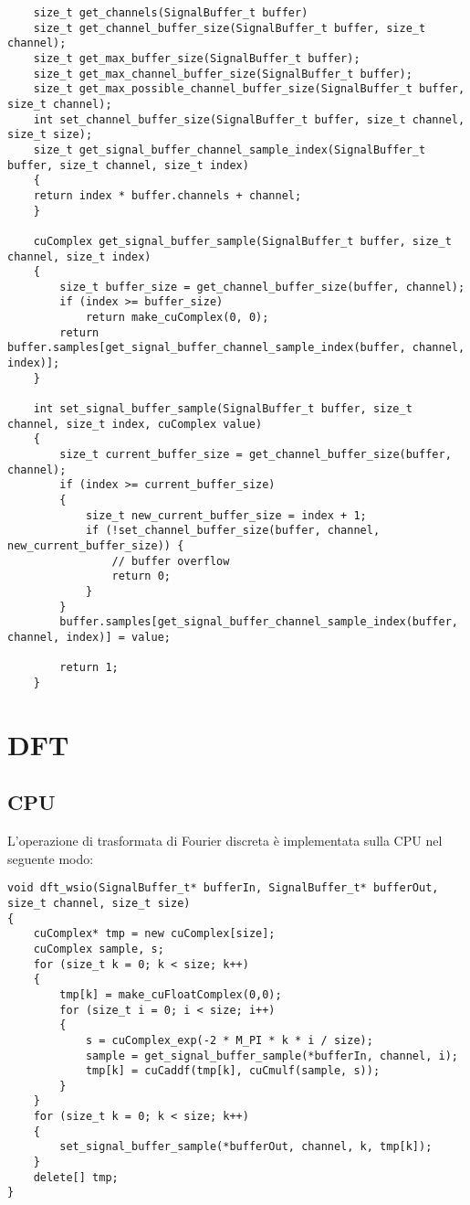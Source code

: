 \begin{lstlisting}
    size_t get_channels(SignalBuffer_t buffer)
    size_t get_channel_buffer_size(SignalBuffer_t buffer, size_t channel);
    size_t get_max_buffer_size(SignalBuffer_t buffer);
    size_t get_max_channel_buffer_size(SignalBuffer_t buffer);
    size_t get_max_possible_channel_buffer_size(SignalBuffer_t buffer, size_t channel);
    int set_channel_buffer_size(SignalBuffer_t buffer, size_t channel, size_t size);
    size_t get_signal_buffer_channel_sample_index(SignalBuffer_t buffer, size_t channel, size_t index)
    {
	return index * buffer.channels + channel;
    }

    cuComplex get_signal_buffer_sample(SignalBuffer_t buffer, size_t channel, size_t index)
    {
        size_t buffer_size = get_channel_buffer_size(buffer, channel);
        if (index >= buffer_size)
            return make_cuComplex(0, 0);
        return buffer.samples[get_signal_buffer_channel_sample_index(buffer, channel, index)];
    }
    
    int set_signal_buffer_sample(SignalBuffer_t buffer, size_t channel, size_t index, cuComplex value)
    {
        size_t current_buffer_size = get_channel_buffer_size(buffer, channel);
        if (index >= current_buffer_size)
        {
            size_t new_current_buffer_size = index + 1;
            if (!set_channel_buffer_size(buffer, channel, new_current_buffer_size)) {
                // buffer overflow
                return 0;
            }
        }
        buffer.samples[get_signal_buffer_channel_sample_index(buffer, channel, index)] = value;
    
        return 1;
    }

\end{lstlisting}

\section{DFT}
\subsection{CPU}
L'operazione di trasformata di Fourier discreta è implementata sulla CPU nel seguente modo:

\begin{lstlisting}
void dft_wsio(SignalBuffer_t* bufferIn, SignalBuffer_t* bufferOut, size_t channel, size_t size)
{
	cuComplex* tmp = new cuComplex[size];
	cuComplex sample, s;
	for (size_t k = 0; k < size; k++)
	{
		tmp[k] = make_cuFloatComplex(0,0);
		for (size_t i = 0; i < size; i++)
		{
			s = cuComplex_exp(-2 * M_PI * k * i / size);
			sample = get_signal_buffer_sample(*bufferIn, channel, i);
			tmp[k] = cuCaddf(tmp[k], cuCmulf(sample, s));
		}
	}
	for (size_t k = 0; k < size; k++)
	{
		set_signal_buffer_sample(*bufferOut, channel, k, tmp[k]);
	}
	delete[] tmp;
}
\end{lstlisting}

